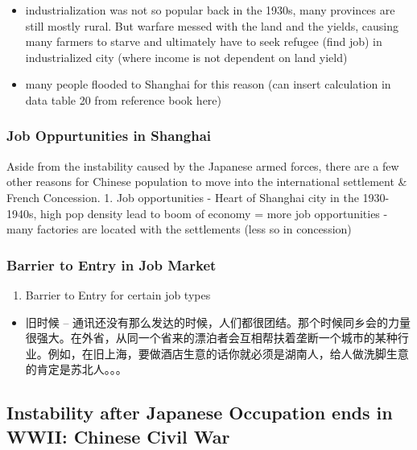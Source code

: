 \documentclass[
  letterpaper,
  DIV=11,
  numbers=noendperiod]{scrartcl}
\providecommand{\tightlist}{%
  \setlength{\itemsep}{0pt}\setlength{\parskip}{0pt}}\usepackage{longtable,booktabs,array}
\begin{document}
\begin{itemize}
\tightlist
\item
  industrialization was not so popular back in the 1930s, many provinces
  are still mostly rural. But warfare messed with the land and the
  yields, causing many farmers to starve and ultimately have to seek
  refugee (find job) in industrialized city (where income is not
  dependent on land yield)
\item
  many people flooded to Shanghai for this reason (can insert
  calculation in data table 20 from reference book here)
\end{itemize}

\hypertarget{job-oppurtunities-in-shanghai}{%
\subsubsection{Job Oppurtunities in
Shanghai}\label{job-oppurtunities-in-shanghai}}

Aside from the instability caused by the Japanese armed forces, there
are a few other reasons for Chinese population to move into the
international settlement \& French Concession. 1. Job opportunities -
Heart of Shanghai city in the 1930-1940s, high pop density lead to boom
of economy = more job opportunities - many factories are located with
the settlements (less so in concession)

\hypertarget{barrier-to-entry-in-job-market}{%
\subsubsection{Barrier to Entry in Job
Market}\label{barrier-to-entry-in-job-market}}

\begin{enumerate}
\def\labelenumi{\arabic{enumi}.}
\setcounter{enumi}{1}
\tightlist
\item
  Barrier to Entry for certain job types
\end{enumerate}

\begin{itemize}
\tightlist
\item
  旧时候 --
  通讯还没有那么发达的时候，人们都很团结。那个时候同乡会的力量很强大。在外省，从同一个省来的漂泊者会互相帮扶着垄断一个城市的某种行业。例如，在旧上海，要做酒店生意的话你就必须是湖南人，给人做洗脚生意的肯定是苏北人。。。
\end{itemize}

\hypertarget{instability-after-japanese-occupation-ends-in-wwii-chinese-civil-war}{%
\subsection{Instability after Japanese Occupation ends in WWII: Chinese
Civil
War}\label{instability-after-japanese-occupation-ends-in-wwii-chinese-civil-war}}
\end{document}
